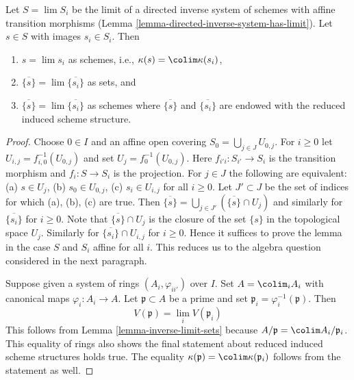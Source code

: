 \begin{lemma}
\label{lemma-inverse-limit-irreducibles}
Let $S = \lim S_i$ be the limit of a directed inverse system
of schemes with affine transition morphisms
(Lemma \ref{lemma-directed-inverse-system-has-limit}).
Let $s \in S$ with images $s_i \in S_i$.
Then
\begin{enumerate}
\item $s = \lim s_i$ as schemes, i.e., $\kappa(s) = \colim \kappa(s_i)$,
\item $\overline{\{s\}} = \lim \overline{\{s_i\}}$ as sets, and
\item $\overline{\{s\}} = \lim \overline{\{s_i\}}$ as schemes
where $\overline{\{s\}}$ and $\overline{\{s_i\}}$ are
endowed with the reduced induced scheme structure.
\end{enumerate}
\end{lemma}

\begin{proof}
Choose $0 \in I$ and an affine open covering
$S_0 = \bigcup_{j \in J} U_{0, j}$.
For $i \geq 0$ let $U_{i, j} = f_{i, 0}^{-1}(U_{0, j})$
and set $U_j = f_0^{-1}(U_{0, j})$.
Here $f_{i'i} : S_{i'} \to S_i$ is the transition morphism
and $f_i : S \to S_i$ is the projection.
For $j \in J$ the following are equivalent:
(a) $s \in U_j$, (b) $s_0 \in U_{0, j}$,
(c) $s_i \in U_{i, j}$ for all $i \geq 0$.
Let $J' \subset J$ be the set of indices for which (a), (b), (c) are true.
Then $\overline{\{s\}} = \bigcup_{j \in J'} (\overline{\{s\}} \cap U_j)$
and similarly for $\overline{\{s_i\}}$ for $i \geq 0$.
Note that $\overline{\{s\}} \cap U_j$ is the closure of the
set $\{s\}$ in the topological space $U_j$. Similarly for
$\overline{\{s_i\}} \cap U_{i, j}$ for $i \geq 0$.
Hence it suffices to prove the lemma in the case
$S$ and $S_i$ affine for all $i$. This reduces us to the
algebra question considered in the next paragraph.

\medskip\noindent
Suppose given a system of rings $(A_i, \varphi_{ii'})$
over $I$. Set $A = \colim_i A_i$ with canonical maps
$\varphi_i : A_i \to A$. Let $\mathfrak p \subset A$ be a
prime and set $\mathfrak p_i = \varphi_i^{-1}(\mathfrak p)$.
Then
$$
V(\mathfrak p) = \lim_i V(\mathfrak p_i)
$$
This follows from Lemma \ref{lemma-inverse-limit-sets}
because $A/\mathfrak p = \colim A_i/\mathfrak p_i$.
This equality of rings also shows the final statement
about reduced induced scheme structures holds true.
The equality $\kappa(\mathfrak p) = \colim \kappa(\mathfrak p_i)$
follows from the statement as well.
\end{proof}

